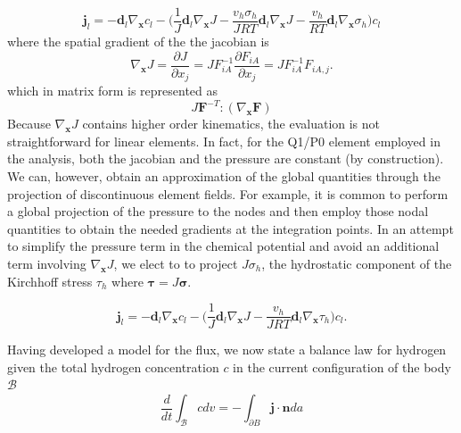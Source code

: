 \documentclass[10pt]{elsarticle}
\newcommand{\mbs}[1]{\boldsymbol{#1}}
\def\bs{{\mbs{s}}} \def\bt{{\mbs{t}}} \def\bu{{\mbs{u}}}
\def\bs{\boldsymbol}
\begin{document}
\begin{equation}
\label{eq.flux2}{\bs{j}_{l} = -\bs{d}_{l}  \nabla_{\bs{x}}c_{l} - \bigg(\frac{1}{J} \bs{d}_{l} \nabla_{\bs{x}}J -  \frac{v_{h}\sigma_{h}}{JRT} \bs{d}_{l} \nabla_{\bs{x}}J} - \frac{v_{h}}{R T} \bs{d}_{l} \nabla_{\bs{x}} \sigma_{h} \bigg)c_{l}
\end{equation}
%
where the spatial gradient of the the jacobian is 
%
\begin{equation}
\label{eq.gradJ}{ \nabla_{\bs{x}}J} = \frac {\partial J} {\partial x_j} = J F^{-1}_{iA} \frac {\partial F_{iA}} {\partial x_j} = J F^{-1}_{iA} F_{iA,j}.
\end{equation}
which in matrix form is represented as
%
\begin{equation}
J \boldsymbol{F}^{-T}:(\nabla_{\boldsymbol{x}} \boldsymbol{F})
\end{equation}
%
Because $\nabla_{\bs{x}}J$ contains higher order kinematics, the evaluation is not straightforward for linear elements. In fact, for the Q1/P0 element employed in the analysis, both the jacobian and the pressure are constant (by construction). We can, however, obtain an approximation of the global quantities through the projection of discontinuous element fields.  For example, it is common to perform a global projection of the pressure to the nodes and then employ those nodal quantities to obtain the needed gradients at the integration points. In an attempt to simplify the pressure term in the chemical potential and avoid an additional term involving $\nabla_{\bs{x}}J$, we elect to to project $J \sigma_{h}$,  the hydrostatic component of the Kirchhoff stress $\tau_{h}$ where $\bs{\tau} = J \bs{\sigma}$.

%
\begin{equation}
\label{eq.flux3}{\bs{j}_{l} = -\bs{d}_{l}  \nabla_{\bs{x}}c_{l}  - \bigg(\frac{1}{J} \bs{d}_{l} \nabla_{\bs{x}}J -  \frac{v_{h}}{JR T} \bs{d}_{l} \nabla_{\bs{x}} \tau_{h}}\bigg)c_{l}.
\end{equation}

Having developed a model for the flux, we now state a balance law for hydrogen given the total hydrogen concentration $c$ in the current configuration of the body $\mathcal{B}$
%
\begin{equation}
\label{eq.hconservation} \frac{d}{dt} \int_{\mathcal{B}} c dv = -\int_{\partial B} \bs{j} \cdot \bs{n} da 
\end{equation}
%
\end{document}

